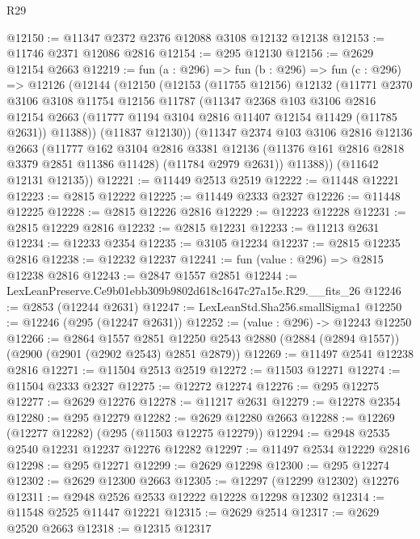\begin{lexlean}{R29}
\begin{coremodule}
@12150 := @11347 @2372 @2376 @12088 @3108 @12132 @12138
@12153 := @11746 @2371 @12086 @2816
@12154 := @295 @12130
@12156 := @2629 @12154 @2663
@12219 := fun (a : @296) =>
  fun (b : @296) =>
  fun (c : @296) =>
  @12126
    (@12144
      (@12150
        (@12153
          (@11755 @12156)
          @12132
          (@11771
            @2370
            @3106
            @3108
            @11754
            @12156
            @11787
            (@11347
              @2368
              @103
              @3106
              @2816
              @12154
              @2663
              (@11777 @1194 @3104 @2816 @11407 @12154 @11429 (@11785 @2631))
              @11388))
          (@11837 @12130))
        (@11347
          @2374
          @103
          @3106
          @2816
          @12136
          @2663
          (@11777
            @162
            @3104
            @2816
            @3381
            @12136
            (@11376 @161 @2816 @2818 @3379 @2851 @11386 @11428)
            (@11784 @2979 @2631))
          @11388))
      (@11642 @12131 @12135))
@12221 := @11449 @2513 @2519
@12222 := @11448 @12221
@12223 := @2815 @12222
@12225 := @11449 @2333 @2327
@12226 := @11448 @12225
@12228 := @2815 @12226 @2816
@12229 := @12223 @12228
@12231 := @2815 @12229 @2816
@12232 := @2815 @12231
@12233 := @11213 @2631
@12234 := @12233 @2354
@12235 := @3105 @12234
@12237 := @2815 @12235 @2816
@12238 := @12232 @12237
@12241 := fun (value : @296) => @2815 @12238 @2816
@12243 := @2847 @1557 @2851
@12244 := LexLeanPreserve.Ce9b01ebb309b9802d618c1647c27a15e.R29.__fits_26
@12246 := @2853 (@12244 @2631)
@12247 := LexLeanStd.Sha256.smallSigma1
@12250 := @12246 (@295 (@12247 @2631))
@12252 := (value : @296) -> @12243 @12250
@12266 := @2864
    @1557
    @2851
    @12250
    @2543
    @2880
    (@2884 (@2894 @1557))
    (@2900 (@2901 (@2902 @2543) @2851 @2879))
@12269 := @11497 @2541 @12238 @2816
@12271 := @11504 @2513 @2519
@12272 := @11503 @12271
@12274 := @11504 @2333 @2327
@12275 := @12272 @12274
@12276 := @295 @12275
@12277 := @2629 @12276
@12278 := @11217 @2631
@12279 := @12278 @2354
@12280 := @295 @12279
@12282 := @2629 @12280 @2663
@12288 := @12269 (@12277 @12282) (@295 (@11503 @12275 @12279))
@12294 := @2948 @2535 @2540 @12231 @12237 @12276 @12282
@12297 := @11497 @2534 @12229 @2816
@12298 := @295 @12271
@12299 := @2629 @12298
@12300 := @295 @12274
@12302 := @2629 @12300 @2663
@12305 := @12297 (@12299 @12302) @12276
@12311 := @2948 @2526 @2533 @12222 @12228 @12298 @12302
@12314 := @11548 @2525 @11447 @12221
@12315 := @2629 @2514
@12317 := @2629 @2520 @2663
@12318 := @12315 @12317

\end{coremodule}
\end{lexlean}
